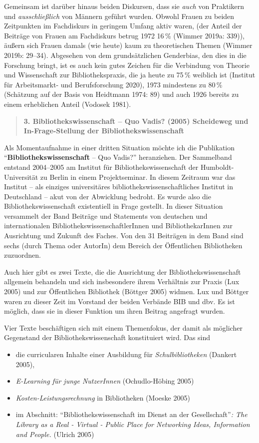\documentclass[a4paper,
fontsize=11pt,
oneside,
numbers=noperiodatend,
parskip=half-,
bibliography=totoc,
final
]{scrartcl}
\begin{document}
Gemeinsam ist darüber hinaus beiden Diskursen, dass sie \emph{auch} von
Praktikern und \emph{ausschließlich} von Männern geführt wurden. Obwohl
Frauen zu beiden Zeitpunkten im Fachdiskurs in geringem Umfang aktiv
waren, (der Anteil der Beiträge von Frauen am Fachdiskurs betrug 1972
16\,\% (Wimmer 2019a: 339)), äußern sich Frauen damals (wie heute) kaum
zu theoretischen Themen (Wimmer 2019b: 29--34). Abgesehen von dem
grundsätzlichen Genderbias, den dies in die Forschung bringt, ist es
auch kein gutes Zeichen für die Verbindung von Theorie und Wissenschaft
zur Bibliothekspraxis, die ja heute zu 75\,\% weiblich ist (Institut für
Arbeitsmarkt- und Berufsforschung 2020), 1973 mindestens zu 80\,\%
(Schätzung auf der Basis von Heidtmann 1974: 89) und auch 1926 bereits
zu einem erheblichen Anteil (Vodosek 1981).

\begin{quote}
\textbf{3. Bibliothekswissenschaft -- Quo Vadis? (2005) Scheideweg und
In-Frage-Stellung der Bibliothekswissenschaft}
\end{quote}

Als Momentaufnahme in einer dritten Situation möchte ich die Publikation
\enquote{\textbf{Bibliothekswissenschaft} -- Quo Vadis?} heranziehen.
Der Sammelband entstand 2004--2005 am Institut für
Bibliothekswissenschaft der Humboldt-Universität zu Berlin in einem
Projektseminar. In diesem Zeitraum war das Institut -- als einziges
universitäres bibliothekswissenschaftliches Institut in Deutschland --
akut von der Abwicklung bedroht. Es wurde also die
Bibliothekswissenschaft existentiell in Frage gestellt. In dieser
Situation versammelt der Band Beiträge und Statements von deutschen und
internationalen BibliothekswissenschaftlerInnen und BibliothekarInnen
zur Ausrichtung und Zukunft des Faches. Von den 31 Beiträgen in dem Band
sind sechs (durch Thema oder AutorIn) dem Bereich der Öffentlichen
Bibliotheken zuzuordnen.

Auch hier gibt es zwei Texte, die die Ausrichtung der
Bibliothekswissenschaft allgemein behandeln und sich insbesondere ihrem
Verhältnis zur Praxis (Lux 2005) und zur Öffentlichen Bibliothek
(Böttger 2005) widmen. Lux und Böttger waren zu dieser Zeit im Vorstand
der beiden Verbände BIB und dbv. Es ist möglich, dass sie in dieser
Funktion um ihren Beitrag angefragt wurden.

Vier Texte beschäftigen sich mit einem Themenfokus, der damit als
möglicher Gegenstand der Bibliothekswissenschaft konstituiert wird. Das
sind

\begin{itemize}
\item
  die curricularen Inhalte einer Ausbildung für \emph{Schulbibliotheken}
  (Dankert 2005),
\item
  \emph{E-Learning für junge NutzerInnen} (Ochudlo-Höbing 2005)
\item
  \emph{Kosten-Leistungsrechnung} in Bibliotheken (Moeske 2005)
\item
  im Abschnitt: \enquote{Bibliothekswissenschaft im Dienst an der
  Gesellschaft}\emph{: The Library as a Real - Virtual - Public Place
  for Networking Ideas, Information and People.} (Ulrich 2005)
\end{itemize}
\end{document}

